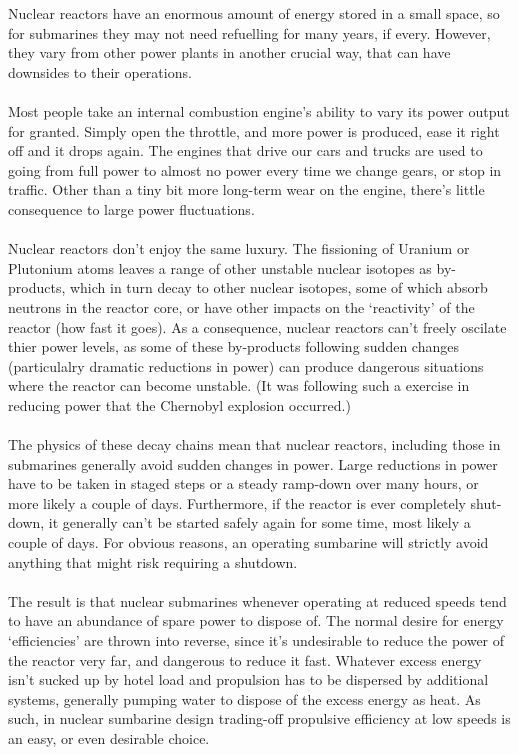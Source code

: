 \documentclass{article}\usepackage[]{graphicx}\usepackage[]{color}
\begin{document}
\begin{tcolorbox}[width=0.8\textwidth, center, colback=blue!5!white,colframe=blue!75!black, title= The other reason reactors are different]
Nuclear reactors have an enormous amount of energy stored in a small space, so for submarines they may not need refuelling for many years, if every.  However, they vary from other power plants in another crucial way, that can have downsides to their operations.
\\
\\
Most people take an internal combustion engine's ability to vary its power output for granted.  Simply open the throttle, and more power is produced, ease it right off and it drops again.  The engines that drive our cars and trucks are used to going from full power to almost no power every time we change gears, or stop in traffic.  Other than a tiny bit more long-term wear on the engine, there's little consequence to large power fluctuations.
\\
\\
Nuclear reactors don't enjoy the same luxury.  The fissioning of Uranium or Plutonium atoms leaves a range of other unstable nuclear isotopes as by-products, which in turn decay to other nuclear isotopes, some of which absorb neutrons in the reactor core, or have other impacts on the `reactivity' of the reactor (how fast it goes). As a consequence, nuclear reactors can't freely oscilate thier power levels, as some of these by-products following sudden changes (particulalry dramatic reductions in power) can produce dangerous situations where the reactor can become unstable.  (It was following such a exercise in reducing power that the Chernobyl explosion occurred.)
\\
\\
The physics of these decay chains mean that nuclear reactors, including those in submarines generally avoid sudden changes in power.  Large reductions in power have to be taken in staged steps or a steady ramp-down over many hours, or more likely a couple of days.  Furthermore, if the reactor is ever completely shut-down, it generally can't be started safely again for some time, most likely a couple of days.  For obvious reasons, an operating sumbarine will strictly avoid anything that might risk requiring a shutdown.
\\
\\
The result is that nuclear submarines whenever operating at reduced speeds tend to have an abundance of spare power to dispose of.  The normal desire for energy `efficiencies' are thrown into reverse, since it's undesirable to reduce the power of the reactor very far, and dangerous to reduce it fast. Whatever excess energy isn't sucked up by hotel load and propulsion has to be dispersed by additional systems, generally pumping water to dispose of the excess energy as heat. As such, in nuclear sumbarine design trading-off propulsive efficiency at low speeds is an easy, or even desirable choice.
\end{tcolorbox}
\end{document}
